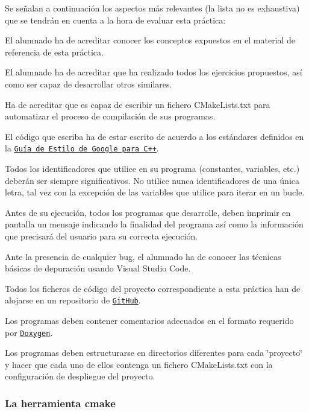 Se señalan a continuación los aspectos más relevantes (la lista no es exhaustiva) que se tendrán en cuenta a la hora de evaluar esta práctica\+:
\begin{DoxyItemize}
\item El alumnado ha de acreditar conocer los conceptos expuestos en el material de referencia de esta práctica.
\item El alumnado ha de acreditar que ha realizado todos los ejercicios propuestos, así como ser capaz de desarrollar otros similares.
\item Ha de acreditar que es capaz de escribir un fichero C\+Make\+Lists.\+txt para automatizar el proceso de compilación de sus programas.
\item El código que escriba ha de estar escrito de acuerdo a los estándares definidos en la \href{https://google.github.io/styleguide/cppguide.html}{\tt Guía de Estilo de Google para C++}.
\item Todos los identificadores que utilice en su programa (constantes, variables, etc.) deberán ser siempre significativos. No utilice nunca identificadores de una única letra, tal vez con la excepción de las variables que utilice para iterar en un bucle.
\item Antes de su ejecución, todos los programas que desarrolle, deben imprimir en pantalla un mensaje indicando la finalidad del programa así como la información que precisará del usuario para su correcta ejecución.
\item Ante la presencia de cualquier bug, el alumnado ha de conocer las técnicas básicas de depuración usando Visual Studio Code.
\item Todos los ficheros de código del proyecto correspondiente a esta práctica han de alojarse en un repositorio de \href{https://github.com/}{\tt Git\+Hub}.
\item Los programas deben contener comentarios adecuados en el formato requerido por \href{https://www.doxygen.nl/index.html}{\tt Doxygen}.
\item Los programas deben estructurarse en directorios diferentes para cada \char`\"{}proyecto\char`\"{} y hacer que cada uno de ellos contenga un fichero {\ttfamily C\+Make\+Lists.\+txt} con la configuración de despliegue del proyecto.
\end{DoxyItemize}

\subsubsection*{La herramienta {\ttfamily cmake}}

